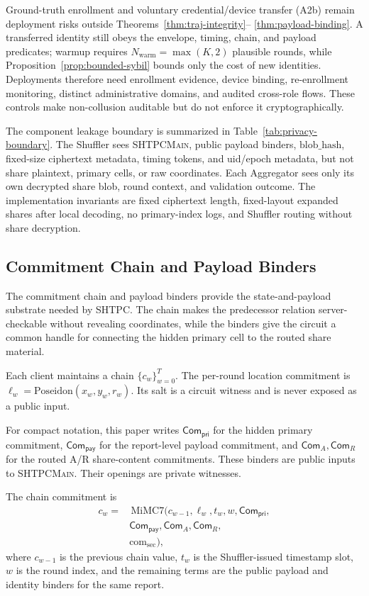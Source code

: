 \documentclass[journal]{IEEEtran}
\theoremstyle{definition}
\theoremstyle{plain}
\begin{document}
Ground-truth enrollment and voluntary credential/device transfer (A2b) remain
deployment risks outside Theorems~\ref{thm:traj-integrity}--
\ref{thm:payload-binding}. A transferred identity still obeys the envelope,
timing, chain, and payload predicates; warmup requires
\(N_{\mathrm{warm}}=\max(K,2)\) plausible rounds, while
Proposition~\ref{prop:bounded-sybil} bounds only the cost of new identities.
Deployments therefore need enrollment evidence, device binding, re-enrollment
monitoring, distinct administrative domains, and audited cross-role flows.
These controls make non-collusion auditable but do not enforce it
cryptographically.

The component leakage boundary is summarized in
Table~\ref{tab:privacy-boundary}. The Shuffler sees \textsc{SHTPCMain}, public
payload binders, \(\mathrm{blob\_hash}\), fixed-size ciphertext metadata,
timing tokens, and uid/epoch metadata, but not share plaintext, primary cells,
or raw coordinates. Each Aggregator sees only its own decrypted share blob,
round context, and validation outcome. The implementation invariants are fixed
ciphertext length, fixed-layout expanded shares after local decoding, no
primary-index logs, and Shuffler routing without share decryption.

\subsection{Commitment Chain and Payload Binders}
\label{sec:commitment}

The commitment chain and payload binders provide the state-and-payload substrate
needed by SHTPC. The chain makes the predecessor relation server-checkable
without revealing coordinates, while the binders give the circuit a common
handle for connecting the hidden primary cell to the routed share material.

Each client maintains a chain $\{c_w\}_{w=0}^{T}$. The per-round location
commitment is $\ell_w=\mathrm{Poseidon}(x_w,y_w,r_w)$. Its salt is a circuit
witness and is never exposed as a public input.

For compact notation, this paper writes
$\mathsf{Com}_{\mathsf{pri}}$ for the hidden primary commitment,
$\mathsf{Com}_{\mathsf{pay}}$ for the report-level payload commitment, and
$\mathsf{Com}_{A},\mathsf{Com}_{R}$ for the routed A/R share-content
commitments. These binders are public inputs to \textsc{SHTPCMain}. Their
openings are private witnesses.

The chain commitment is
\begin{equation}
  \begin{aligned}
    c_w ={}&\,\mathrm{MiMC7}(c_{w-1},\ell_w,t_w,w,\mathsf{Com}_{\mathsf{pri}},\\
      &\mathsf{Com}_{\mathsf{pay}},\mathsf{Com}_{A},\mathsf{Com}_{R},\\
    &\mathrm{com}_{\mathrm{sec}}),
  \end{aligned}
\end{equation}
\noindent where $c_{w-1}$ is the previous chain value, $t_w$ is the Shuffler-issued
timestamp slot, $w$ is the round index, and the remaining terms are the public
payload and identity binders for the same report.
\end{document}
